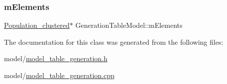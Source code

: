 \subsubsection{\texorpdfstring{m\+Elements}{mElements}}
{\footnotesize\ttfamily \hyperlink{class_population__clustered}{Population\+\_\+clustered}$\ast$ Generation\+Table\+Model\+::m\+Elements}



The documentation for this class was generated from the following files\+:\begin{DoxyCompactItemize}
\item 
model/\hyperlink{model__table__generation_8h}{model\+\_\+table\+\_\+generation.\+h}\item 
model/\hyperlink{model__table__generation_8cpp}{model\+\_\+table\+\_\+generation.\+cpp}\end{DoxyCompactItemize}
